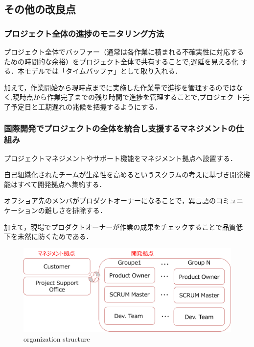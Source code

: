 \documentclass[a4j, 12Q, twocolumn, twoside]{jsarticle}
\begin{document}
\subsection{その他の改良点}

\subsubsection{プロジェクト全体の進捗のモニタリング方法}
プロジェクト全体でバッファー（通常は各作業に積まれる不確実性に対応する
ための時間的な余裕）をプロジェクト全体で共有することで,遅延を見える化
する．本モデルでは「タイムバッファ」として取り入れる．

加えて，作業開始から現時点までに実施した作業量で進捗を管理するのではな
く,現時点から作業完了までの残り時間で進捗を管理することで,プロジェク
ト完了予定日と工期遅れの兆候を把握するようにする．

\subsubsection{国際開発でプロジェクトの全体を統合し支援するマネジメントの仕組み}
プロジェクトマネジメントやサポート機能をマネジメント拠点へ設置する．

自己組織化されたチームが生産性を高めるというスクラムの考えに基づき開発機
能はすべて開発拠点へ集約する．

オフショア先のメンバがプロダクトオーナーになることで，異言語のコミュニ
ケーションの難しさを排除する．

加えて，現場でプロダクトオーナーが作業の成果をチェックすることで品質低
下を未然に防くためである．

\begin{figure}
  \begin{center}
    \includegraphics[width=\columnwidth]{./figures/organization_model.png}
    \caption{organization structure}
    \label{fig:organizationstructure}
  \end{center}
\end{figure}
\end{document}

